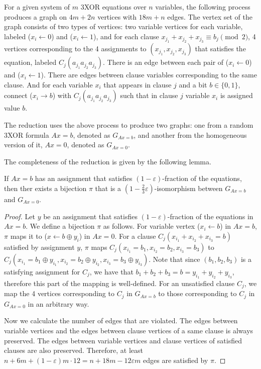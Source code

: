 \documentclass[a4paper,twoside,justified]{tufte-handout}
\begin{document}
For a given system of $m$ 3XOR equations over $n$ variables, the following process produces a graph
on $4m+2n$ vertices with $18m+n$ edges. The vertex set of the graph consists of two types of vertices:
two variable vertices for each
variable, labeled ($x_i \leftarrow 0$) and ($x_i \leftarrow 1$),
and for each clause $x_{j_1}+x_{j_2}+x_{j_3} \equiv b_j \pmod{2}$, 4 vertices corresponding
to the 4 assignments to $(x_{j_1},x_{j_2},x_{j_3})$ that satisfies the equation,
labeled $C_j(a_{j_1} a_{j_2} a_{j_3})$.
There is an edge between each pair of ($x_i \leftarrow 0$) and ($x_i \leftarrow 1$).
There are edges between clause variables corresponding to the same clause. And for each variable
$x_i$ that appears in clause $j$ and a bit $b \in \{0,1\}$, connect
($x_i \rightarrow b$) with $C_j(a_{j_1} a_{j_2} a_{j_3})$ such that in clause $j$ variable $x_i$ is assigned
value $b$.

The reduction uses the above process to produce two graphs: one from a random 3XOR formula $Ax=b$,
denoted as $G_{Ax=b}$, and another from the homogeneous version of it, $Ax=0$, denoted as $G_{Ax=0}$.

The completeness of the reduction is given by the following lemma.
\begin{lemma}\label{lemma:completeness}
  If $Ax=b$ has an assignment that satisfies $(1-\varepsilon)$-fraction of the equations,
  then ther exists a bijection $\pi$ that is a $(1-\frac{2}{3}\varepsilon)$-isomorphism between 
  $G_{Ax=b}$ and $G_{Ax=0}$.
\end{lemma}
\begin{proof}
  Let $y$ be an assignment that satisfies $(1-\varepsilon)$-fraction of the equations in $Ax=b$. We define
  a bijection $\pi$ as follows.
  For variable vertex ($x_i \leftarrow b$) in $Ax=b$, $\pi$ maps it to ($x \leftarrow b \oplus y_i$)
  in $Ax=0$. For a clause $C_j(x_{i_1}+x_{i_2}+x_{i_3}=b)$ satisfied by assignment $y$, $\pi$ maps
  $C_j(x_{i_1}=b_1,x_{i_2}=b_2,x_{i_3}=b_3)$ to $C_j(x_{i_1}=b_1 \oplus y_{i_1}, x_{i_2}=b_2 \oplus y_{i_2}, x_{i_3}=b_3 \oplus y_{i_3})$.
  Note that since $(b_1,b_2,b_3)$ is a satisfying assignment for $C_j$, we have that
  $b_1+b_2+b_3 = b = y_{i_1}+y_{i_2}+y_{i_3}$, therefore this part of the mapping is well-defined.
  For an unsatisfied clause $C_j$, we map the 4 vertices corresponding to $C_j$ in $G_{Ax=b}$
  to those corresponding to $C_j$ in $G_{Ax=0}$ in an arbitrary way.

  Now we calculate the number of edges that are violated. The edges between variable vertices and the edges between
  clause vertices of a same clause is always preserved. The edges between variable vertices and clause vertices
  of satisfied clauses are also preserved. Therefore, at least $n+6m+(1-\varepsilon)m \cdot 12=n+18m-12\varepsilon m$ edges
  are satisfied by $\pi$.
\end{proof}
\end{document}
